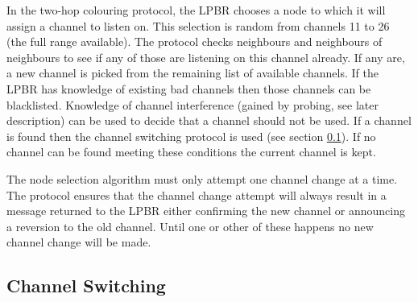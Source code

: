 In the two-hop colouring protocol, the LPBR chooses a node to which it will assign a channel to listen on.  
This selection is random from channels 11 to 26 (the full range available). The protocol checks neighbours and neighbours of neighbours to see if any of those are listening on this channel already. If any are, a new channel is picked from the remaining list of available channels. If the LPBR has knowledge of existing bad channels then those channels can be blacklisted.  Knowledge of channel interference (gained by probing, see later description) can be used to decide that a channel should not be used. If a channel is found then the channel switching protocol is used (see section \ref{sec:channelswitch}). If no channel can be found meeting these conditions the current
channel is kept.  

The node selection algorithm must only attempt one channel change at a time. The protocol ensures that the channel change attempt will always result in a message returned to the LPBR either confirming the new channel or announcing a reversion to the old channel. Until one or other of these happens no new channel change will be made.





\subsection{Channel Switching}
\label{sec:channelswitch}

